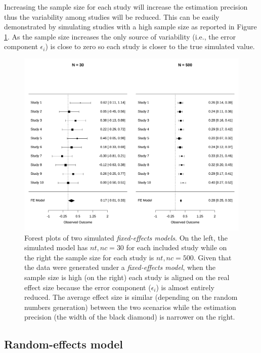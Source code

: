 \documentclass[
  man,floatsintext]{apa6}
\begin{document}
\normalsize

Increasing the sample size for each study will increase the estimation precision thus the variability among studies will be reduced. This can be easily demonstrated by simulating studies with a high sample size as reported in Figure \ref{fig:fixed-effect-high-low-precision}. As the sample size increases the only source of variability (i.e., the error component \(\epsilon_{i}\)) is close to zero so each study is closer to the true simulated value.

\scriptsize

\begin{figure}[H]

{\centering \includegraphics[width=0.8\linewidth]{paper_files/figure-latex/fixed-effect-high-low-precision-1} 

}

\caption{Forest plots of two simulated \emph{fixed-effects models}. On the left, the simulated model has \(nt,nc = 30\) for each included study while on the right the sample size for each study is \(nt,nc = 500\). Given that the data were generated under a \emph{fixed-effects model}, when the sample size is high (on the right) each study is aligned on the real effect size because the error component (\(\epsilon_{i}\)) is almost entirely reduced. The average effect size is similar (depending on the random numbers generation) between the two scenarios while the estimation precision (the width of the black diamond) is narrower on the right.}\label{fig:fixed-effect-high-low-precision}
\end{figure}

\normalsize

\hypertarget{re-model}{%
\subsection{Random-effects model}\label{re-model}}
\end{document}
